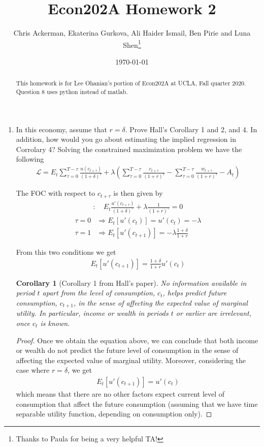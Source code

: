 \documentclass[11pt]{article}
\author{Chris Ackerman, Ekaterina Gurkova, Ali Haider Ismail, Ben Pirie and Luna Shen\thanks{Thanks to Paula for being a very helpful TA!}}
\date{\today}
\title{Econ202A Homework 2}
\newtheorem*{corollary}{Corollary}
\begin{document}
\maketitle
\begin{abstract}
This homework is for Lee Ohanian's portion of Econ202A at UCLA, Fall quarter 2020. Question 8 uses python instead of matlab.
\end{abstract}
\newpage

\begin{enumerate}
\item In this economy, assume that $r = \delta$. Prove Hall’s Corollary 1 and 2, and 4. In addition, how would you go about estimating the implied regression in Corrolary 4?
Solving the constrained maximization problem we have the following
\begin{align*}
    \mathcal{L} = E_t \sum_{\tau=0}^{T-\tau} \frac{u(c_{t+\tau})}{(1+\delta)^\tau} + \lambda \left(\sum_{\tau=0}^{T-\tau} \frac{c_{t+\tau}}{(1+r)^\tau} - \sum_{\tau=0}^{T-\tau}\frac{w_{t+\tau}}{(1+r)^\tau} - A_t \right)
\end{align*}

The FOC with respect to $c_{t+\tau}$ is then given by
\begin{align*}
    [c_{t+\tau}]: \quad  E_t \frac{u'(c_{t+\tau})}{(1+\delta)^\tau} + \lambda \frac{1}{(1+r)^\tau} = 0
\end{align*}
\begin{align*}
    \tau = 0 & \Rightarrow E_t [u'(c_t)] = u'(c_t) = -\lambda\\
    \tau = 1 & \Rightarrow E_t [u'(c_{t+1})] = - \lambda \frac{1+\delta}{1+r}
\end{align*}

From this two conditions we get
\begin{align*}
    E_t [u'(c_{t+1})] =  \frac{1+\delta}{1+r} u'(c_t)
\end{align*}

\begin{corollary}[Corollary 1 from Hall's paper]
No information available in period $t$ apart from the level of consumption, $c_t$, helps predict future consumption, $c_{t+1}$, in the sense of affecting the expected value of marginal utility. In particular, income or wealth in periods $t$ or earlier are irrelevant, once $c_t$ is known. 
\end{corollary}

\begin{proof}
Once we obtain the equation above, we can conclude that both income or wealth do not predict the future level of consumption in the sense of affecting the expected value of marginal utility. Moreover, considering the case where $r=\delta$, we get
\begin{align*}
    E_t [u'(c_{t+1})] =   u'(c_t)
\end{align*}
which means that there are no other factors expect current level of consumption that affect the future consumption (assuming that we have time separable utility function, depending on consumption only).
\end{proof}


\end{enumerate}
\end{document}
